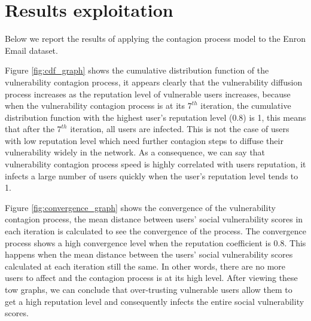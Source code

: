 \section{Results exploitation} \label{sec:Results exploitation}

Below we report the results of applying the contagion process model to the Enron Email dataset.


	
Figure \ref{fig:cdf_graph} shows the cumulative distribution function of the vulnerability contagion process,
	it appears clearly that the vulnerability diffusion process increases as the reputation level of vulnerable users increases,
	because when the vulnerability contagion process is at its $7^{th}$ iteration,
	the cumulative distribution function with the highest user's reputation level (0.8) is 1,
	this means that after the $7^{th}$ iteration,
	all users are infected.
This is not the case of users with low reputation level which need further contagion steps to diffuse their vulnerability widely in the network.
As a consequence,
	we can say that vulnerability contagion process speed is highly correlated with users reputation,
	it infects a large number of users quickly when the user's reputation level tends to 1.


Figure \ref{fig:convergence_graph} shows the convergence of the vulnerability contagion process,
	the mean distance between users' social vulnerability scores in each iteration is calculated to see the convergence of the process.
The convergence process shows a high convergence level when the reputation coefficient is 0.8.
This happens when the mean distance between the users' social vulnerability scores calculated at each iteration still the same.
In other words,
	there are no more users to affect and the contagion process is at its high level.
After viewing these tow graphs,
	we can conclude that over-trusting vulnerable users allow them to get a high reputation level and consequently infects the entire social vulnerability scores.

